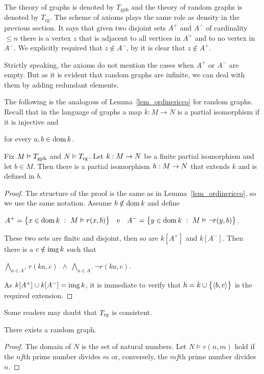 \documentclass[creche.tex]{subfiles}
\begin{document}
The theory of graphs is denoted by \emph{$T_{\textrm{gph}}$} and the theory of random graphs is denoted by \emph{$T_{\textrm{rg}}$}.
The scheme of axioms  plays the same role as density in the previous section.
It says that given two disjoint sets $A^+$ and $A^-$ of cardinality $\le n$ there is a vertex $z$ that is adjacent to all vertices in $A^+$ and to no vertex in $A^-$.
We explicitly required that $z\notin A^-$, by  it is clear that $z\notin A^+$.

Strictly speaking, the axioms  do not mention the cases when $A^+$ or $A^-$ are empty.
But as it is evident that random graphs are infinite, we can deal with them by adding redundant elements.

The following is the analogous of Lemma~\ref{lem_ordinericco} for random graphs.
Recall that in the language of graphs a map $k:M\to N$ is a partial isomorphism if it is injective and

\hfill for every $a,b\in\dom k$.

\begin{lemma}\label{lem_graforicco}
Fix $M\models T_{\rm gph}$ and $N\models T_{\rm rg}$.
Let $k:M\imp N$ be a finite partial isomorphism and let $b\in M$.
Then there is a partial isomorphism $h:M\imp N$ that extends $k$ and is defined in $b$.
\end{lemma}
\begin{proof} The structure of the proof is the same as in Lemma~\ref{lem_ordinericco}, so we use the same notation.
Assume $b\notin\dom k$ and define\medskip

\hfil$A^+=\big\{x\in\dom k\ :\ M\models r(x,b)\big\}\ \ \ \textrm{e}\ \ \ A^-=\big\{y\in\dom k\ :\  M\models \neg r(y,b)\big\}$.\medskip

These two sets are finite and disjoint, then so are $k[A^+]$ and $k[A^-]$.
Then there is a $c\notin\range k$ such that\medskip

\hfil$\displaystyle\bigwedge_{a\in A^+}r(ka,c)\ \ \wedge\ \bigwedge_{a\in A^-}\neg r(ka,c)$.

As $k[A^+]\cup k[A^-]=\range k$, it is immediate to verify that $h=k\cup\big\{\<b,c\>\big\}$ is the required extension.
\end{proof}


Some readers may doubt that $T_{\rm rg}$ is consistent.

\begin{proposition}
There exists a random graph.
\end{proposition}
\begin{proof}
The domain of $N$ is the set of natural numbers.
Let $N\models r(n,m)$ hold if the $n\jj$th prime number divides $m$ or, conversely, the $m\jj$th prime number divides $n$.
\end{proof}
\end{document}
